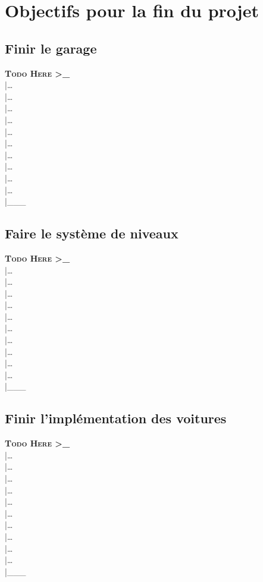 \documentclass[12pt,a4paper]{article}
\begin{document}
    \section{Objectifs pour la fin du projet}
        \subsection{Finir le garage}
            \textbf{\textsc{Todo Here >\_}}\\
            |\dots\\|\dots\\|\dots\\|\dots\\|\dots\\|\dots\\|\dots\\|\dots\\|\dots\\|\dots\\|\_\_\_\\
        \subsection{Faire le système de niveaux}
            \textbf{\textsc{Todo Here >\_}}\\
            |\dots\\|\dots\\|\dots\\|\dots\\|\dots\\|\dots\\|\dots\\|\dots\\|\dots\\|\dots\\|\_\_\_\\
        \subsection{Finir l'implémentation des voitures}
            \textbf{\textsc{Todo Here >\_}}\\
            |\dots\\|\dots\\|\dots\\|\dots\\|\dots\\|\dots\\|\dots\\|\dots\\|\dots\\|\dots\\|\_\_\_\\
\end{document}
